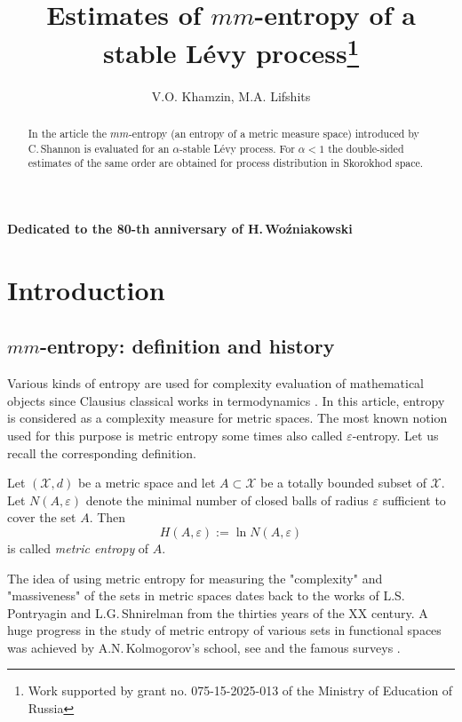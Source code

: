 \documentclass[12pt]{article}
\let\ep\varepsilon
\theoremstyle{definition}
\begin{document}
\title{Estimates of $mm$-entropy of a stable L\'evy process\footnote{Work supported by grant no. 075-15-2025-013
of the Ministry of Education of Russia}}
\author{V.O. Khamzin, M.A. Lifshits}

\maketitle
\hfill {\bf Dedicated to the 80-th anniversary of H.\,Wo\'zniakowski}
\bigskip

\begin{abstract}
In the article the $mm$-entropy (an entropy of a metric measure space) introduced by C.\,Shannon is evaluated for an $\alpha$-stable L\'evy process. For $\alpha<1$ the double-sided
estimates of the same order are obtained for process distribution in Skorokhod space.
\end{abstract}

\section{Introduction}

\subsection{$mm$-entropy: definition and history}
Various kinds of entropy are used for complexity evaluation of mathematical objects since Clausius classical works in termodynamics \cite{Rudolf}.
In this article, entropy is considered as a complexity measure for metric spaces. The most known  notion used for this purpose is metric entropy some times also called $\ep$-entropy. Let us recall the corresponding definition.

Let $(\mathcal{X}, d)$ be a metric space and let $A\subset \mathcal{X}$ be a totally bounded subset of $\mathcal{X}$.
Let $N(A, \ep)$ denote the minimal number of closed balls of radius $\ep$ sufficient to cover the set $A$. Then
\[
   H(A, \ep) := \ln N(A, \ep)
\]
is called  \textit{metric entropy} of $A$.

The idea of using metric entropy for measuring the  "complexity" and  "massiveness" of the sets in metric spaces dates back
to the works of L.S.\,Pont\-ryagin and L.G.\,Shnirelman from the thirties years of the XX century. A huge progress in the study of
metric entropy of various sets in functional spaces was achieved by A.N.\,Kolmogorov's school, see \cite{Kolmogorov} and the famous surveys \cite{KolmogorovTihomirov,Tih1,Tih2, Tih3}.
\end{document}
